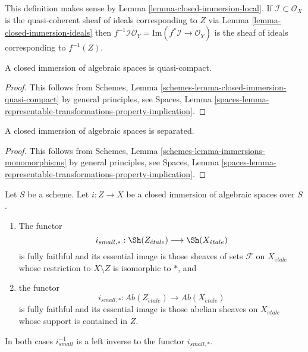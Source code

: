 \noindent
This definition makes sense by Lemma \ref{lemma-closed-immersion-local}.
If $\mathcal{I} \subset \mathcal{O}_X$ is the quasi-coherent sheaf of
ideals corresponding to $Z$ via Lemma \ref{lemma-closed-immersion-ideals} then
$f^{-1}\mathcal{I}\mathcal{O}_Y = \text{Im}(f^*\mathcal{I} \to \mathcal{O}_Y)$
is the sheaf of ideals corresponding to $f^{-1}(Z)$.

\begin{lemma}
\label{lemma-closed-immersion-quasi-compact}
A closed immersion of algebraic spaces is quasi-compact.
\end{lemma}

\begin{proof}
This follows from
Schemes, Lemma \ref{schemes-lemma-closed-immersion-quasi-compact}
by general principles, see
Spaces, Lemma
\ref{spaces-lemma-representable-transformations-property-implication}.
\end{proof}

\begin{lemma}
\label{lemma-closed-immersion-separated}
A closed immersion of algebraic spaces is separated.
\end{lemma}

\begin{proof}
This follows from
Schemes, Lemma \ref{schemes-lemma-immersions-monomorphisms}
by general principles, see
Spaces, Lemma
\ref{spaces-lemma-representable-transformations-property-implication}.
\end{proof}

\begin{lemma}
\label{lemma-closed-immersion-push-pull}
Let $S$ be a scheme. Let $i : Z \to X$ be a closed immersion of algebraic
spaces over $S$.
\begin{enumerate}
\item The functor
$$
i_{small, *} :
\Sh(Z_{\acute{e}tale})
\longrightarrow
\Sh(X_{\acute{e}tale})
$$
is fully faithful and its essential image is those sheaves of sets
$\mathcal{F}$ on $X_{\acute{e}tale}$ whose restriction to $X \setminus Z$ is
isomorphic to $*$, and
\item the functor
$$
i_{small, *} :
\textit{Ab}(Z_{\acute{e}tale})
\longrightarrow
\textit{Ab}(X_{\acute{e}tale})
$$
is fully faithful and its essential image is those abelian sheaves on
$X_{\acute{e}tale}$ whose support is contained in $Z$.
\end{enumerate}
In both cases $i_{small}^{-1}$ is a left inverse to the functor
$i_{small, *}$.
\end{lemma}

